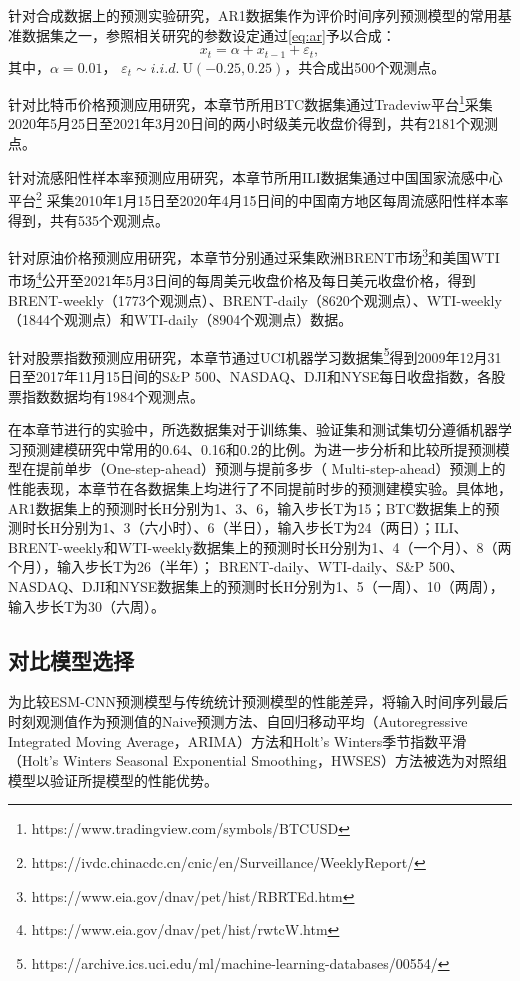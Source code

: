 


针对合成数据上的预测实验研究，AR1数据集作为评价时间序列预测模型的常用基准数据集之一，参照相关研究\cite{qi2008trend,crone2016feature}的参数设定通过\autoref{eq:ar}予以合成：
    \begin{equation}
        \label{eq:ar}
            x_t = \alpha + x_{t-1} + \varepsilon_t,
    \end{equation}
    其中，$\alpha = 0.01$， $\varepsilon_t \sim i.i.d.~\mathrm{U}(-0.25,0.25)$，共合成出500个观测点。

针对比特币价格预测应用研究，本章节所用BTC数据集通过Tradeviw平台\footnote{https://www.tradingview.com/symbols/BTCUSD}采集2020年5月25日至2021年3月20日间的两小时级美元收盘价得到，共有2181个观测点。

针对流感阳性样本率预测应用研究，本章节所用ILI数据集通过中国国家流感中心平台\footnote{https://ivdc.chinacdc.cn/cnic/en/Surveillance/WeeklyReport/} 采集2010年1月15日至2020年4月15日间的中国南方地区每周流感阳性样本率得到，共有535个观测点。

针对原油价格预测应用研究，本章节分别通过采集欧洲BRENT市场\footnote{https://www.eia.gov/dnav/pet/hist/RBRTEd.htm}和美国WTI市场\footnote{ https://www.eia.gov/dnav/pet/hist/rwtcW.htm}公开至2021年5月3日间的每周美元收盘价格及每日美元收盘价格，得到BRENT-weekly（1773个观测点）、BRENT-daily（8620个观测点）、WTI-weekly（1844个观测点）和WTI-daily（8904个观测点）数据。

针对股票指数预测应用研究，本章节通过UCI机器学习数据集\footnote{https://archive.ics.uci.edu/ml/machine-learning-databases/00554/}得到2009年12月31日至2017年11月15日间的S\&P 500、NASDAQ、DJI和NYSE每日收盘指数，各股票指数数据均有1984个观测点。

在本章节进行的实验中，所选数据集对于训练集、验证集和测试集切分遵循机器学习预测建模研究中常用的0.64、0.16和0.2的比例。为进一步分析和比较所提预测模型在提前单步（One-step-ahead）预测与提前多步（ Multi-step-ahead）预测上的性能表现，本章节在各数据集上均进行了不同提前时步的预测建模实验。具体地，AR1数据集上的预测时长H分别为1、3、6，输入步长T为15；BTC数据集上的预测时长H分别为1、3（六小时）、6（半日），输入步长T为24（两日）；ILI、BRENT-weekly和WTI-weekly数据集上的预测时长H分别为1、4（一个月）、8（两个月），输入步长T为26（半年）； BRENT-daily、WTI-daily、S\&P 500、NASDAQ、DJI和NYSE数据集上的预测时长H分别为1、5（一周）、10（两周），输入步长T为30（六周）。

\subsection{对比模型选择}
为比较ESM-CNN预测模型与传统统计预测模型的性能差异，将输入时间序列最后时刻观测值作为预测值的Naive预测方法、自回归移动平均（Autoregressive Integrated Moving Average，ARIMA）方法\cite{floresEvolutive2012}和Holt’s Winters季节指数平滑（Holt’s Winters Seasonal Exponential Smoothing，HWSES）方法\cite{chatfieldHoltwinters1978}被选为对照组模型以验证所提模型的性能优势。

